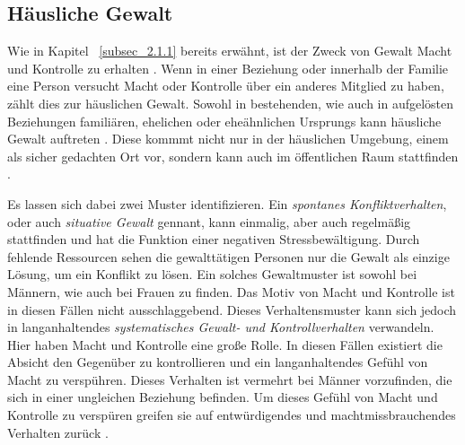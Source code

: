 \subsection{Häusliche Gewalt}    \label{subsec_2.1.2}
Wie in Kapitel ~\ref{subsec_2.1.1} bereits erwähnt, ist der Zweck von Gewalt Macht und Kontrolle zu erhalten \parencite{Def_Aggressivität_vs_violence}. Wenn in einer Beziehung oder innerhalb der Familie eine Person versucht Macht oder Kontrolle über ein anderes Mitglied zu haben, zählt dies zur häuslichen Gewalt. Sowohl in bestehenden, wie auch in aufgelösten Beziehungen familiären, ehelichen oder eheähnlichen Ursprungs kann häusliche Gewalt auftreten \parencite{Def_haus_Gewalt, Def_haus_Gewalt_2}. Diese kommmt nicht nur in der häuslichen Umgebung, einem als sicher gedachten Ort vor, sondern kann auch im öffentlichen Raum stattfinden \parencite{Gewaltarten_WHO}. 

Es lassen sich dabei zwei Muster identifizieren. Ein \textit{spontanes Konfliktverhalten}, oder auch \textit{situative Gewalt} gennant, kann einmalig, aber auch regelmäßig stattfinden und hat die Funktion einer negativen Stressbewältigung. Durch fehlende Ressourcen sehen die gewalttätigen Personen nur die Gewalt als einzige Lösung, um ein Konflikt zu lösen. Ein solches Gewaltmuster ist sowohl bei Männern, wie auch bei Frauen zu finden. Das Motiv von Macht und Kontrolle ist in diesen Fällen nicht ausschlaggebend. Dieses Verhaltensmuster kann sich jedoch in langanhaltendes \textit{systematisches Gewalt- und Kontrollverhalten} verwandeln. Hier haben Macht und Kontrolle eine große Rolle. In diesen Fällen existiert die Absicht den Gegenüber zu kontrollieren und ein langanhaltendes Gefühl von Macht zu verspühren. Dieses Verhalten ist vermehrt bei Männer vorzufinden, die sich in einer ungleichen Beziehung befinden. Um dieses Gefühl von Macht und Kontrolle zu verspüren greifen sie auf entwürdigendes und machtmissbrauchendes Verhalten zurück \parencite{Def_Form_Folge_Gewalt}.


